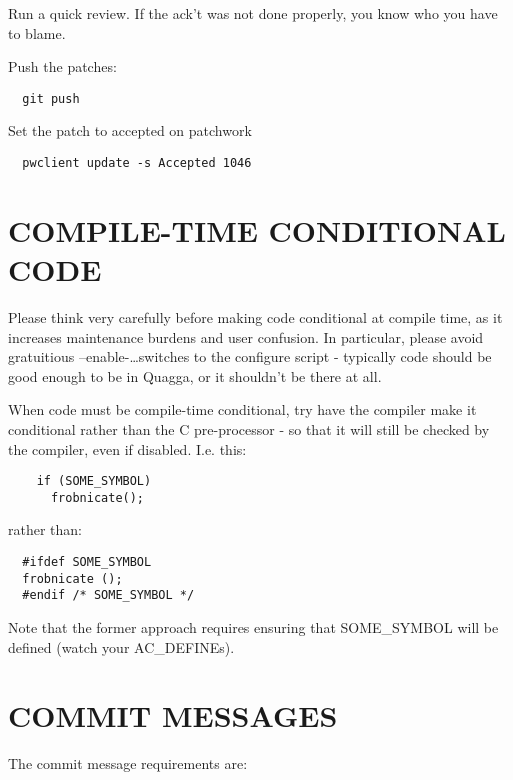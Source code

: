 \documentclass[oneside]{article}
\begin{document}
Run a quick review. If the ack't was not done properly, you know who you have
to blame.

Push the patches:
\begin{verbatim}
  git push
\end{verbatim}

Set the patch to accepted on patchwork
\begin{verbatim}
  pwclient update -s Accepted 1046
\end{verbatim}

\section{COMPILE-TIME CONDITIONAL CODE}

Please think very carefully before making code conditional at compile time,
as it increases maintenance burdens and user confusion. In particular,
please avoid gratuitious --enable-\ldots switches to the configure script -
typically code should be good enough to be in Quagga, or it shouldn't be
there at all.

When code must be compile-time conditional, try have the compiler make it
conditional rather than the C pre-processor - so that it will still be
checked by the compiler, even if disabled. I.e.  this:

\begin{verbatim}
    if (SOME_SYMBOL)
      frobnicate();
\end{verbatim}

rather than:

\begin{verbatim}
  #ifdef SOME_SYMBOL
  frobnicate ();
  #endif /* SOME_SYMBOL */
\end{verbatim}

Note that the former approach requires ensuring that SOME\_SYMBOL will be
defined (watch your AC\_DEFINEs).


\section{COMMIT MESSAGES}

The commit message requirements are:
\end{document}
